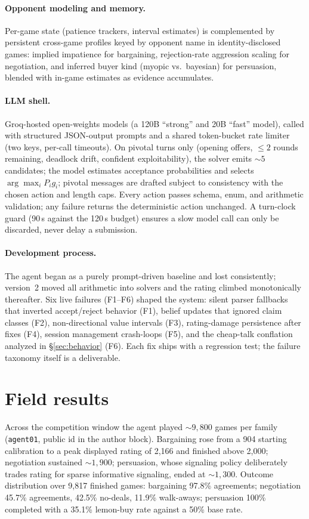 \documentclass{article}
\begin{document}
\paragraph{Opponent modeling and memory.} Per-game state (patience trackers, interval estimates) is complemented by persistent cross-game profiles keyed by opponent name in identity-disclosed games: implied impatience for bargaining, rejection-rate aggression scaling for negotiation, and inferred buyer kind (myopic vs.\ bayesian) for persuasion, blended with in-game estimates as evidence accumulates.

\paragraph{LLM shell.} Groq-hosted open-weights models (a 120B ``strong'' and 20B ``fast'' model), called with structured JSON-output prompts and a shared token-bucket rate limiter (two keys, per-call timeouts). On pivotal turns only (opening offers, $\le 2$ rounds remaining, deadlock drift, confident exploitability), the solver emits ${\sim}5$ candidates; the model estimates acceptance probabilities and selects $\arg\max_i P_i g_i$; pivotal messages are drafted subject to consistency with the chosen action and length caps. Every action passes schema, enum, and arithmetic validation; any failure returns the deterministic action unchanged. A turn-clock guard (90\,s against the 120\,s budget) ensures a slow model call can only be discarded, never delay a submission.

\paragraph{Development process.} The agent began as a purely prompt-driven baseline and lost consistently; version~2 moved all arithmetic into solvers and the rating climbed monotonically thereafter. Six live failures (F1--F6) shaped the system: silent parser fallbacks that inverted accept/reject behavior (F1), belief updates that ignored claim classes (F2), non-directional value intervals (F3), rating-damage persistence after fixes (F4), session management crash-loops (F5), and the cheap-talk conflation analyzed in \S\ref{sec:behavior} (F6). Each fix ships with a regression test; the failure taxonomy itself is a deliverable.

\section{Field results}
Across the competition window the agent played ${\sim}9{,}800$ games per family (\texttt{agent01}, public id in the author block). Bargaining rose from a 904 starting calibration to a peak displayed rating of 2{,}166 and finished above 2{,}000; negotiation sustained ${\sim}1{,}900$; persuasion, whose signaling policy deliberately trades rating for sparse informative signaling, ended at ${\sim}1{,}300$. Outcome distribution over 9{,}817 finished games: bargaining 97.8\% agreements; negotiation 45.7\% agreements, 42.5\% no-deals, 11.9\% walk-aways; persuasion 100\% completed with a 35.1\% lemon-buy rate against a 50\% base rate.
\end{document}
